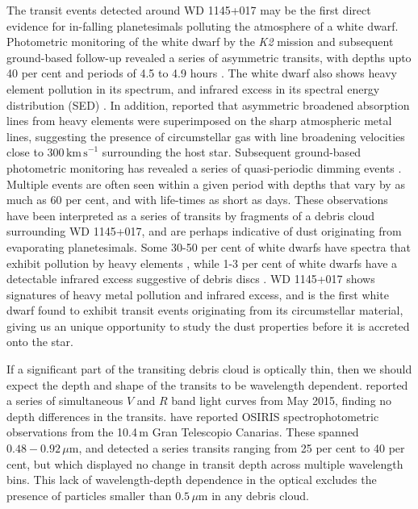 \documentclass[useAMS,usenatbib]{mn2e}
\begin{document}
The transit events detected around WD 1145+017 may be the first direct evidence for in-falling planetesimals polluting the atmosphere of a white dwarf. Photometric monitoring of the white dwarf by the \emph{K2} mission \citep{2014PASP..126..398H} and subsequent ground-based follow-up revealed a series of asymmetric transits, with depths upto 40 per cent and periods of 4.5 to 4.9 hours \citep{2015Natur.526..546V}. The white dwarf also shows heavy element pollution in its spectrum, and infrared excess in its spectral energy distribution (SED) \citep{2015Natur.526..546V,2016ApJ...816L..22X}. In addition, \citet{2016ApJ...816L..22X} reported that asymmetric broadened absorption lines from heavy elements were superimposed on the sharp atmospheric metal lines, suggesting the presence of circumstellar gas with line broadening velocities close to 300$\,\mathrm{km\,s}^{-1}$ surrounding the host star. Subsequent ground-based photometric monitoring has revealed a series of quasi-periodic dimming events \citep{2015Natur.526..546V,2015arXiv151006434C,2016ApJ...818L...7G,2016MNRAS.tmp..406R,2016arXiv160308823A}. Multiple events are often seen within a given period with depths that vary by as much as 60 per cent, and with life-times as short as days. These observations have been interpreted as a series of transits by fragments of a debris cloud surrounding WD 1145+017, and are perhaps indicative of dust originating from evaporating planetesimals. Some 30-50 per cent of white dwarfs have spectra that exhibit pollution by heavy elements \citep[e.g.][]{2003ApJ...596..477Z,2010ApJ...722..725Z,2014A&A...566A..34K}, while 1-3 per cent of white dwarfs have a detectable infrared excess suggestive of debris discs \citep[e.g.][]{2007ApJS..171..206M,2009ApJ...694..805F,2011MNRAS.417.1210G,2011ApJS..197...38D,2015MNRAS.449..574R}. WD 1145+017 shows signatures of heavy metal pollution and infrared excess, and is the first white dwarf found to exhibit transit events originating from its circumstellar material, giving us an unique opportunity to study the dust properties before it is accreted onto the star. 

If a significant part of the transiting debris cloud is optically thin, then we should expect the depth and shape of the transits to be wavelength dependent. \citet{2015arXiv151006434C} reported a series of simultaneous $V$ and $R$ band light curves from May 2015, finding no depth differences in the transits. \citet{2016arXiv160308823A} have reported OSIRIS spectrophotometric observations from the 10.4\,m Gran Telescopio Canarias. These spanned $0.48-0.92\,\mu\mathrm{m}$, and detected a series transits ranging from 25 per cent to 40 per cent, but which displayed no change in transit depth across multiple wavelength bins. This lack of wavelength-depth dependence in the optical excludes the presence of particles smaller than $ 0.5\,\mu \mathrm{m}$ in any debris cloud. 
\end{document}
